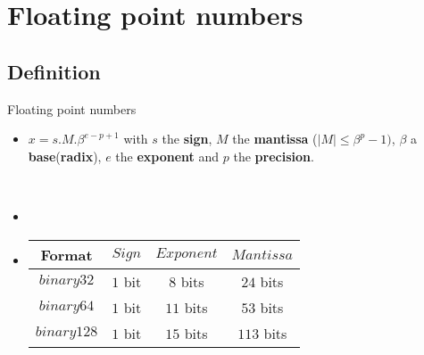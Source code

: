 \section{Floating point numbers}
\subsection{Definition}
\begin{frame}{Floating point numbers}

\begin{itemize}
    

\item <1->  $x = s.M.\beta^{e-p+1}$ with $s$ the \textbf{sign}, $M$ the \textbf{mantissa} ($\lvert M \rvert \le \beta^p-1)$, $\beta$ a \textbf{base}(\textbf{radix}), $e$ the \textbf{exponent} and $p$ the \textbf{precision}. 
  
\ \\ 
 
\item <2->  
 \item <3->  \begin{table}[]
      \centering
      \begin{tabular}{|c|c|c|c|}
      \hline
      
        Format &  $Sign$ &  $Exponent$ & $Mantissa$\\
        \hline
         $binary32$& $1$ bit & $8$ bits & $24$ bits\\
         \hline
        $binary64$ &$1$ bit  & $11$ bits &  $53$ bits\\ 
        \hline
         $binary128$ &$1$ bit &  $15$ bits  &  $113$  bits\\
         \hline
        \end{tabular}
        
      \end{table}
      \end{itemize}
\end{frame}

